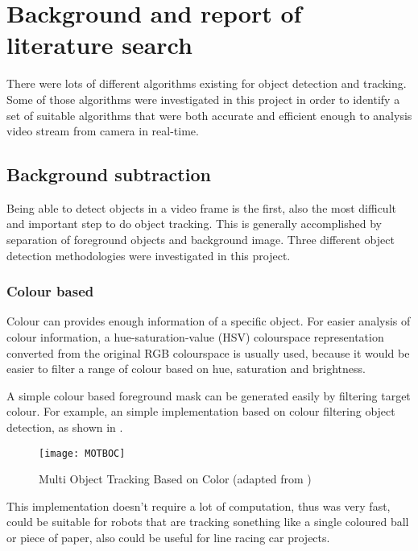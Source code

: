 \chapter{Background and report of literature search}

There were lots of different algorithms existing for object detection and tracking. Some of those algorithms were investigated in this project in order to identify a set of suitable algorithms that were both accurate and efficient enough to analysis video stream from camera in real-time.

\section{Background subtraction}

Being able to detect objects in a video frame is the first, also the most difficult and important step to do object tracking. This is generally accomplished by separation of foreground objects and background image. Three different object detection methodologies were investigated in this project.

\subsection{Colour based}
\label{bgs:colour}

Colour can provides enough information of a specific object. For easier analysis of colour information, a hue-saturation-value (HSV) colourspace \cite[p.~301]{colourspace} representation converted from the original RGB colourspace is usually used, because it would be easier to filter a range of colour based on hue, saturation and brightness.

A simple colour based foreground mask can be generated easily by filtering target colour. For example, an simple implementation \cite{MOTBOC.git} based on colour filtering object detection, as shown in .

\begin{figure}[H]
  \centering
  \texttt{[image: MOTBOC]}
  \caption{Multi Object Tracking Based on Color (adapted from \cite{MOTBOC.git})}
  \label{Figure:MOTBOC}
\end{figure}

This implementation doesn't require a lot of computation, thus was very fast, could be suitable for robots that are tracking sonething like a single coloured ball or piece of paper, also could be useful for line racing car projects.

